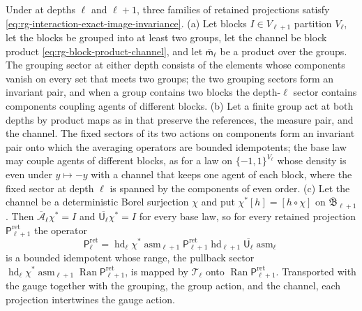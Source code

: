 Under  at depths $\ell$ and $\ell+1$, three families of
retained projections satisfy \eqref{eq:rg-interaction-exact-image-invariance}.
(a) Let blocks $I\in V_{\ell+1}$ partition $V_\ell$, let the blocks be grouped into
at least two groups, let the channel be block product
\eqref{eq:rg-block-product-channel}, and let $\bar{\mathsf m}_\ell$ be a product
over the groups. The grouping sector at either depth consists of the elements whose
components vanish on every set that meets two groups; the two grouping sectors
form an invariant pair, and when a group contains two blocks the depth-$\ell$
sector contains components coupling agents of different blocks. (b) Let a finite
group act at both depths by product maps as in
 that preserve the references, the measure
pair, and the channel. The fixed sectors of its two actions on components form an
invariant pair onto which the averaging operators are bounded idempotents; the base
law may couple agents of different blocks, as for a law on $\{-1,1\}^{V_\ell}$
whose density is even under $y\mapsto-y$ with a channel that keeps one agent of
each block, where the fixed sector at depth $\ell$ is spanned by the components of
even order. (c) Let the channel be a deterministic Borel surjection $\chi$ and put
$\chi^*[h]=[h\circ\chi]$ on $\overline{\mathfrak B}_{\ell+1}$. Then
$\overline{\mathcal A}_\ell\chi^*=I$ and $\overline{\mathsf U_\ell}\chi^*=I$ for
every base law, so for every retained projection $\mathsf P^{\mathrm{ret}}_{\ell+1}$
the operator
\begin{equation}
\mathsf P^{\mathrm{ret}}_\ell
=\operatorname{hd}_\ell\chi^*\operatorname{asm}_{\ell+1}\mathsf P^{\mathrm{ret}}_{\ell+1}
\operatorname{hd}_{\ell+1}\overline{\mathsf U_\ell}\operatorname{asm}_\ell
\label{eq:rg-pullback-retained-projection}
\end{equation}
is a bounded idempotent whose range, the pullback sector
$\operatorname{hd}_\ell\chi^*\operatorname{asm}_{\ell+1}\operatorname{Ran}\mathsf P^{\mathrm{ret}}_{\ell+1}$,
is mapped by $\mathcal T_\ell$ onto $\operatorname{Ran}\mathsf P^{\mathrm{ret}}_{\ell+1}$.
Transported with the gauge together with the grouping, the group action, and the
channel, each projection intertwines the gauge action. 

